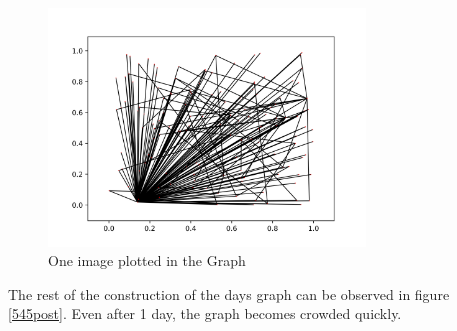 \documentclass{article}
\begin{document}
\begin{figure}[h!]
    \centering
    \includegraphics[width=0.75\textwidth]{NormalImgurGraph1.png}
    \caption{One image plotted in the Graph}
    \label{1post}
\end{figure}


\par The rest of the construction of the days graph can be observed in figure \ref{545post}. Even after 1 day, the graph becomes crowded quickly.
\end{document}
